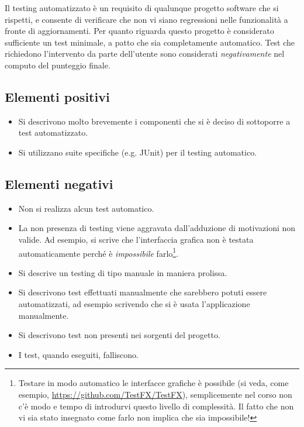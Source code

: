 \documentclass[a4paper,12pt]{report}
\begin{document}
Il testing automatizzato è un requisito di qualunque progetto software che si rispetti, e consente di verificare che non vi siano regressioni nelle funzionalità a fronte di aggiornamenti.
%
Per quanto riguarda questo progetto è considerato sufficiente un test minimale, a patto che sia completamente automatico.
%
Test che richiedono l'intervento da parte dell'utente sono considerati \textit{negativamente} nel computo del punteggio finale.

\subsection*{Elementi positivi}

\begin{itemize}
 \item Si descrivono molto brevemente i componenti che si è deciso di sottoporre a test automatizzato.
 \item Si utilizzano suite specifiche (e.g. JUnit) per il testing automatico.
\end{itemize}

\subsection*{Elementi negativi}
\begin{itemize}
 \item Non si realizza alcun test automatico.
 \item La non presenza di testing viene aggravata dall'adduzione di motivazioni non valide. Ad esempio, si scrive che l'interfaccia grafica non è testata automaticamente perché è \emph{impossibile} farlo\footnote{Testare in modo automatico le interfacce grafiche è possibile (si veda, come esempio, \url{https://github.com/TestFX/TestFX}), semplicemente nel corso non c'è modo e tempo di introdurvi questo livello di complessità. Il fatto che non vi sia stato insegnato come farlo non implica che sia impossibile!}.
 \item Si descrive un testing di tipo manuale in maniera prolissa.
 \item Si descrivono test effettuati manualmente che sarebbero potuti essere automatizzati, ad esempio scrivendo che si è usata l'applicazione manualmente.
 \item Si descrivono test non presenti nei sorgenti del progetto.
 \item I test, quando eseguiti, falliscono.
\end{itemize}
\end{document}
